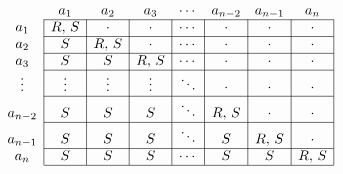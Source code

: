 $
	\begin{array}{c|c|c|c|c|c|c|c|}
		\multicolumn{1}{c}{} & \multicolumn{1}{c}{a_1} & \multicolumn{1}{c}{a_2} & \multicolumn{1}{c}{a_3} & \multicolumn{1}{c}{\cdots} & \multicolumn{1}{c}{a_{n-2}} & \multicolumn{1}{c}{a_{n-1}} & \multicolumn{1}{c}{a_n} \\ \cline{2-8}
		a_1                  & R,\, S                  & \cdot                   & \cdot                   & \cdots                     & \cdot                       & \cdot                       & \cdot                   \\ \cline{2-8}
		a_2                  & S                       & R,\, S                  & \cdot                   & \cdots                     & \cdot                       & \cdot                       & \cdot                   \\ \cline{2-8}
		a_3                  & S                       & S                       & R,\, S                  & \cdots                     & \cdot                       & \cdot                       & \cdot                   \\ \cline{2-8}
		\vdots               & \vdots                  & \vdots                  & \vdots                  & \ddots                     & \cdot                       & \cdot                       & \cdot                   \\ \cline{2-8}
		a_{n-2}              & S                       & S                       & S                       & \ddots                     & R,\, S                      & \cdot                       & \cdot                   \\ \cline{2-8}
		a_{n-1}              & S                       & S                       & S                       & \ddots                     & S                           & R,\, S                      & \cdot                   \\ \cline{2-8}
		a_n                  & S                       & S                       & S                       & \cdots                     & S                           & S                           & R,\, S                  \\ \cline{2-8}
	\end{array}
$\\
